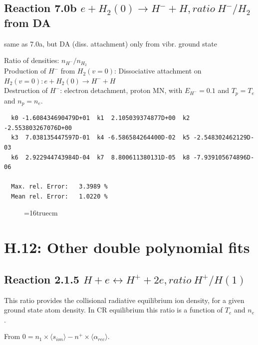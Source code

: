\documentclass[12pt,dvips]{article}
\begin{document}
\subsection{
Reaction 7.0b      $ e + H_2(0) \rightarrow H^- + H, ratio \ H^-/H_2$ from DA
}


 same as 7.0a, but DA (diss. attachment) only from vibr. ground state

  Ratio of densities: $n_{H^-}/n_{H_2}$\\
  Production of $H^-$ from $H_2(v=0)$: Dissociative attachment on $H_2(v=0):  e+H_2(0) \rightarrow H^- + H$    \\
  Destruction of $H^-$: electron detachment, proton MN, with $E_{H^-}=0.1$ and $T_p = T_e$ and $n_p = n_e$.

\begin{small}\begin{verbatim}
  k0 -1.608434690479D+01  k1  2.105039374877D+00  k2 -2.553803267076D+00
  k3  7.038135447597D-01  k4 -6.586584264400D-02  k5 -2.548302462129D-03
  k6  2.922944743984D-04  k7  8.800611380131D-05  k8 -7.939105674896D-06

  Max. rel. Error:   3.3989 %
  Mean rel. Error:   1.0220 %
\end{verbatim}\end{small}


\begin{figure} \label{7.0}
\epsfxsize=16truecm
\end{figure}

\newpage

\section{H.12: Other double polynomial fits}

\subsection{
Reaction 2.1.5   $H + e \leftrightarrow H^+ + 2e,  ratio~ H^+/H(1)$
}
This ratio provides the collisional radiative equilibrium ion
density, for a given ground state atom density. In CR equilibrium this ratio is a function of $T_e$ and $n_e$.

From $0 = n_1 \times  \langle s_{ion} \rangle - n^+ \times \langle\alpha_{rec} \rangle$.
\end{document}
